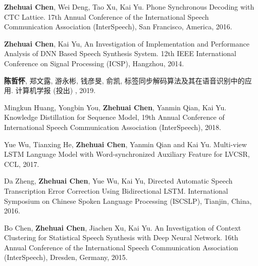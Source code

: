 \begin{publications}{99}
 \item {\bf Zhehuai Chen}, Wei Deng, Tao Xu, Kai Yu. Phone Synchronous Decoding with CTC Lattice. 17th Annual Conference of the International Speech Communication Association (InterSpeech), San Francisco, America, 2016.
 \item {\bf Zhehuai Chen}, Kai Yu, An Investigation of Implementation and Performance Analysis of DNN Based Speech Synthesis System. 12th IEEE International Conference on Signal Processing (ICSP), Hangzhou, 2014.
 \\
 \item {\bf 陈哲怀}, 郑文露, 游永彬, 钱彦旻, 俞凯, 标签同步解码算法及其在语音识别中的应用. 计算机学报 (投出) , 2019.
 \\
 \item Mingkun Huang, Yongbin You, {\bf Zhehuai Chen}, Yanmin Qian, Kai Yu. Knowledge Distillation for Sequence Model, 19th Annual Conference of  International Speech Communication Association (InterSpeech), 2018.
 \item Yue Wu, Tianxing He, {\bf Zhehuai Chen}, Yanmin Qian and Kai Yu. Multi-view LSTM Language Model with Word-synchronized Auxiliary Feature for LVCSR, CCL, 2017.
 \item Da Zheng, {\bf Zhehuai Chen}, Yue Wu, Kai Yu, Directed Automatic Speech Transcription Error Correction Using Bidirectional LSTM. International Symposium on Chinese Spoken Language Processing (ISCSLP), Tianjin, China, 2016.
 \item Bo Chen, {\bf Zhehuai Chen}, Jiachen Xu, Kai Yu. An Investigation of Context Clustering for Statistical Speech Synthesis with Deep Neural Network. 16th Annual Conference of the International Speech Communication Association (InterSpeech), Dresden, Germany, 2015.
\end{publications}
